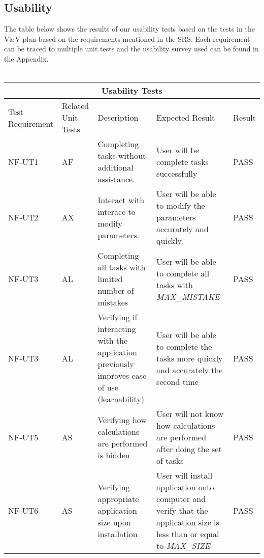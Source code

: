 \documentclass[12pt, titlepage]{article}
\begin{document}
\subsection{Usability}
The table below shows the results of our usability tests based on the tests in the V\&V plan based on the requirements mentioned in the SRS.
Each requirement can be traced to multiple unit tests and the usability survey used can be found in the Appendix.\\
\\
\begin{tabular}{ |p{2.5cm}||p{2cm}|p{4cm}|p{4cm}|p{1.5cm}| }
  \hline
  \multicolumn{5}{|c|}{Usability Tests} \\
  \hline
  Test Requirement & Related Unit Tests & Description & Expected Result & Result\\
  \hline
  NF-UT1   & AF  & Completing tasks without additional assistance. & User will be complete tasks successfully & PASS\\
  \hline
  NF-UT2   & AX  & Interact with interace to modify parameters. & User will be able to modify the parameters accurately and quickly.& PASS\\
  \hline
  NF-UT3   & AL  & Completing all tasks with limited number of mistakes & User will be able to complete all tasks with \textsl{MAX\_MISTAKE} & PASS\\
  \hline
  NF-UT3   & AL  & Verifying if interacting with the application previously improves ease of use (learnability)  & User will be able to complete the tasks more quickly and accurately the second time & PASS\\
  \hline
  NF-UT5   & AS  & Verifying how calculations are performed is hidden &  User will not know how calculations are performed after doing the set of tasks & PASS\\
  \hline
  NF-UT6   & AS  & Verifying appropriate application size upon installation&  User will install application onto computer and verify that the application size is less than or equal to \textsl{MAX\_SIZE} & PASS\\
  \hline
 \end{tabular}
		
\end{document}
